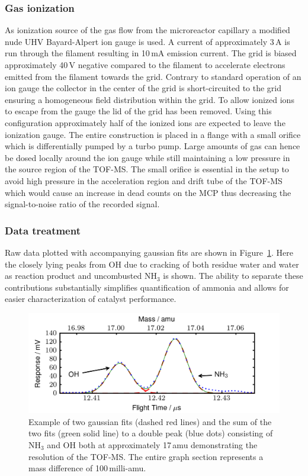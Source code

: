 \documentclass[aip,rsi]{revtex4-1}
\begin{document}
\subsubsection{Gas ionization}
As ionization source of the gas flow from the microreactor capillary a modified nude UHV Bayard-Alpert ion gauge is used. A current of approximately 3\,A is run through the filament resulting in 10\,mA emission current. The grid is biased approximately 40\,V negative compared to the filament to accelerate electrons emitted from the filament towards the grid. Contrary to standard operation of an ion gauge the collector in the center of the grid is short-circuited to the grid ensuring a homogeneous field distribution within the grid. To allow ionized ions to escape from the gauge the lid of the grid has been removed. Using this configuration approximately half of the ionized ions are expected to leave the ionization gauge\cite{Nottingham1955}. The entire construction is placed in a flange with a small orifice which is differentially pumped by a turbo pump. Large amounts of gas can hence be dosed locally around the ion gauge while still maintaining a low pressure in the source region of the TOF-MS. The small orifice is essential in the setup to avoid high pressure in the acceleration region and drift tube of the TOF-MS which would cause an increase in dead counts on the MCP thus decreasing the signal-to-noise ratio of the recorded signal.

\subsubsection{Data treatment}
Raw data plotted with accompanying gaussian fits are shown in Figure~\ref{fig:gaussian_fit}. Here the closely lying peaks from OH due to cracking of both residue water and water as reaction product and uncombusted NH$_3$ is shown. The ability to separate these contributions substantially simplifies quantification of ammonia and allows for easier characterization of catalyst performance. 
\begin{figure}
 \includegraphics[width=14cm]{ammonia_OH_gauss_fit.png}%
 \caption{Example of two gaussian fits (dashed red lines) and the sum of the two fits (green solid line) to a double peak (blue dots) consisting of NH$_{3}$ and OH both at approximately 17\,amu demonstrating the resolution of the TOF-MS. The entire graph section represents a mass difference of 100\,milli-amu.\label{fig:gaussian_fit}}%
\end{figure}
\end{document}
